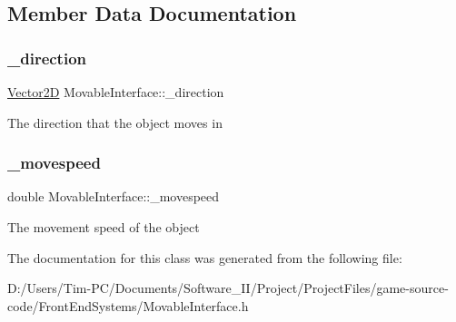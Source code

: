 \subsection{Member Data Documentation}
\mbox{\label{class_movable_interface_aea3e1edf8c32ebe5fd37dc02d659c10d}} 
\subsubsection{\texorpdfstring{\+\_\+direction}{\_direction}}
{\footnotesize\ttfamily \hyperlink{class_vector2_d}{Vector2D} Movable\+Interface\+::\+\_\+direction\hspace{0.3cm}{\ttfamily [protected]}}

The direction that the object moves in \mbox{\label{class_movable_interface_aa9715fd066607de7e71ee7f891ae1dbd}} 
\subsubsection{\texorpdfstring{\+\_\+movespeed}{\_movespeed}}
{\footnotesize\ttfamily double Movable\+Interface\+::\+\_\+movespeed\hspace{0.3cm}{\ttfamily [protected]}}

The movement speed of the object 

The documentation for this class was generated from the following file\+:\begin{DoxyCompactItemize}
\item 
D\+:/\+Users/\+Tim-\/\+P\+C/\+Documents/\+Software\+\_\+\+I\+I/\+Project/\+Project\+Files/game-\/source-\/code/\+Front\+End\+Systems/Movable\+Interface.\+h\end{DoxyCompactItemize}
